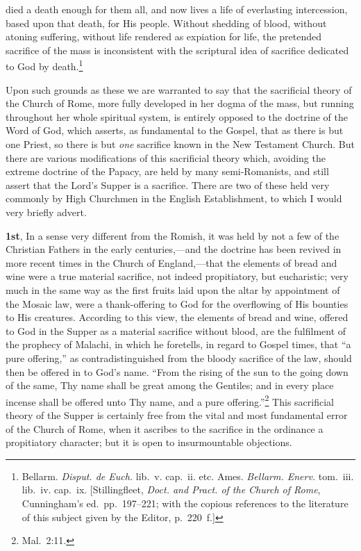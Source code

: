 \documentclass[
]{book}
\begin{document}
died a death enough for them all, and now lives a life of everlasting intercession, based upon that death, for His people. Without shedding of blood, without atoning suffering, without life rendered as expiation for life, the pretended sacrifice of the mass is inconsistent with the scriptural idea of sacrifice dedicated to God by death.\footnote{Bellarm. \emph{Disput. de Euch.} lib.~v. cap.~ii. etc. Ames. \emph{Bellarm. Enerv.} tom.~iii. lib.~iv. cap.~ix. {[}Stillingfleet, \emph{Doct. and Pract. of the Church of Rome}, Cunningham's ed.~pp.~197--221; with the copious references to the literature of this subject given by the Editor, p.~220~f.{]}}

Upon such grounds as these we are warranted to say that the sacrificial theory of the Church of Rome, more fully developed in her dogma of the mass, but running throughout her whole spiritual system, is entirely opposed to the doctrine of the Word of God, which asserts, as fundamental to the Gospel, that as there is but one Priest, so there is but \emph{one} sacrifice known in the New Testament Church. But there are various modifications of this sacrificial theory which, avoiding the extreme doctrine of the Papacy, are held by many semi-Romanists, and still assert that the Lord's Supper is a sacrifice. There are two of these held very commonly by High Churchmen in the English Establishment, to which I would very briefly advert.

\textbf{1st}, In a sense very different from the Romish, it was held by not a few of the Christian Fathers in the early centuries,---and the doctrine has been revived in more recent times in the Church of England,---that the elements of bread and wine were a true material sacrifice, not indeed propitiatory, but eucharistic; very much in the same way as the first fruits laid upon the altar by appointment of the Mosaic law, were a thank-offering to God for the overflowing of His bounties to His creatures. According to this view, the elements of bread and wine, offered to God in the Supper as a material sacrifice without blood, are the fulfilment of the prophecy of Malachi, in which he foretells, in regard to Gospel times, that ``a pure offering,'' as contradistinguished from the bloody sacrifice of the law, should then be offered in to God's name. ``From the rising of the sun to the going down of the same, Thy name shall be great among the Gentiles; and in every place incense shall be offered unto Thy name, and a pure offering.''\footnote{Mal.~2:11.} This sacrificial theory of the Supper is certainly free from the vital and most fundamental error of the Church of Rome, when it ascribes to the sacrifice in the ordinance a propitiatory character; but it is open to insurmountable objections.
\end{document}
